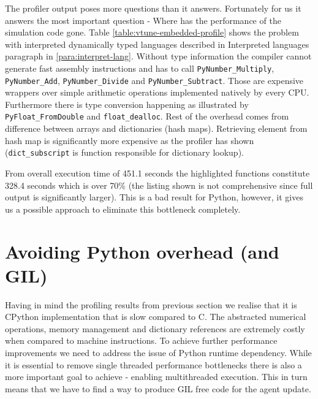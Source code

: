 \documentclass[12pt, a4paper]{report}
\begin{document}
The profiler output poses more questions than it answers. Fortunately for us
it answers the most important question - Where has the performance of the simulation
code gone. Table \ref{table:vtune-embedded-profile} shows the problem with
interpreted dynamically typed languages described in Interpreted languages
paragraph in \ref{para:interpret-lang}. Without type information the compiler
cannot generate fast assembly instructions and has to call
\lstinline{PyNumber_Multiply}, \lstinline{PyNumber_Add}, \lstinline{PyNumber_Divide}
and \lstinline{PyNumber_Subtract}. Those are expensive wrappers over simple arithmetic
operations implemented natively by every CPU. Furthermore there is type conversion
happening as illustrated by \lstinline{PyFloat_FromDouble} and \lstinline{float_dealloc}.
Rest of the overhead comes from difference between arrays and dictionaries (hash maps).
Retrieving element from hash map is significantly more expensive as the profiler has
shown (\lstinline{dict_subscript} is function responsible for dictionary lookup).

From overall execution time of 451.1 seconds the highlighted functions constitute 328.4
seconds which is over 70\% (the listing shown is not comprehensive since full output
is significantly larger). This is a bad result for Python, however, it gives
us a possible approach to eliminate this bottleneck completely.

\section{Avoiding Python overhead (and GIL)}\label{sec:embed-c++}
Having in mind the profiling results from previous section we realise that
it is CPython implementation that is slow compared to C. The abstracted numerical
operations, memory management and dictionary references are extremely costly
when compared to machine instructions. To achieve further performance
improvements we need to address the issue of Python runtime dependency.
While it is essential to remove single threaded performance bottlenecks there is
also a more important goal to achieve - enabling multithreaded execution. This
in turn means that we have to find a way to produce GIL free code for the
agent update.
\end{document}
